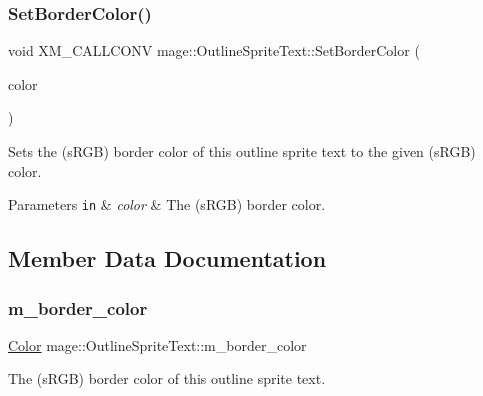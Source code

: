 \subsubsection{\texorpdfstring{Set\+Border\+Color()}{SetBorderColor()}\hspace{0.1cm}{\footnotesize\ttfamily [3/3]}}
{\footnotesize\ttfamily void X\+M\+\_\+\+C\+A\+L\+L\+C\+O\+NV mage\+::\+Outline\+Sprite\+Text\+::\+Set\+Border\+Color (\begin{DoxyParamCaption}\item[{F\+X\+M\+V\+E\+C\+T\+OR}]{color }\end{DoxyParamCaption})\hspace{0.3cm}{\ttfamily [noexcept]}}

Sets the (s\+R\+GB) border color of this outline sprite text to the given (s\+R\+GB) color.


\begin{DoxyParams}[1]{Parameters}
\mbox{\tt in}  & {\em color} & The (s\+R\+GB) border color. \\
\hline
\end{DoxyParams}


\subsection{Member Data Documentation}
\hypertarget{classmage_1_1_outline_sprite_text_a19301d370498a08759445f415da78822}{}\label{classmage_1_1_outline_sprite_text_a19301d370498a08759445f415da78822} 
\subsubsection{\texorpdfstring{m\+\_\+border\+\_\+color}{m\_border\_color}}
{\footnotesize\ttfamily \hyperlink{structmage_1_1_color}{Color} mage\+::\+Outline\+Sprite\+Text\+::m\+\_\+border\+\_\+color\hspace{0.3cm}{\ttfamily [private]}}

The (s\+R\+GB) border color of this outline sprite text. 